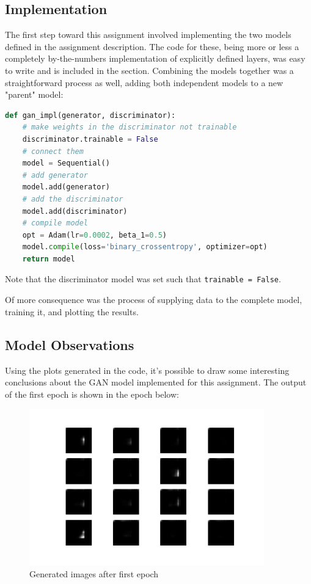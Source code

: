 \documentclass{article}
\begin{document}
\subsection{Implementation} \label{impl}
\par The first step toward this assignment involved implementing the two models defined in the assignment description. 
The code for these, being more or less a completely by-the-numbers implementation of explicitly defined layers, was easy to write and is included in the  section.
Combining the models together was a straightforward process as well, adding both independent models to a new "parent" model:

\begin{lstlisting}[language=Python]
def gan_impl(generator, discriminator):
	# make weights in the discriminator not trainable
	discriminator.trainable = False
	# connect them
	model = Sequential()
	# add generator
	model.add(generator)
	# add the discriminator
	model.add(discriminator)
	# compile model
	opt = Adam(lr=0.0002, beta_1=0.5)
	model.compile(loss='binary_crossentropy', optimizer=opt)
	return model
\end{lstlisting}

\par Note that the discriminator model was set such that \lstinline{trainable = False}.

\par Of more consequence was the process of supplying data to the complete model, training it, and plotting the results.

\subsection{Model Observations} \label{model_obvs}
\par Using the plots generated in the code, it's possible to draw some interesting conclusions about the GAN model implemented for this assignment.
The output of the first epoch is shown in the epoch below:

\begin{figure}[H]
    \centering
    \includegraphics[width=4in]{csci-8110/hw-4/images/generated_plot_e001.png}
    \caption{Generated images after first epoch}
    \label{fig:ep1}
\end{figure}
\end{document}
